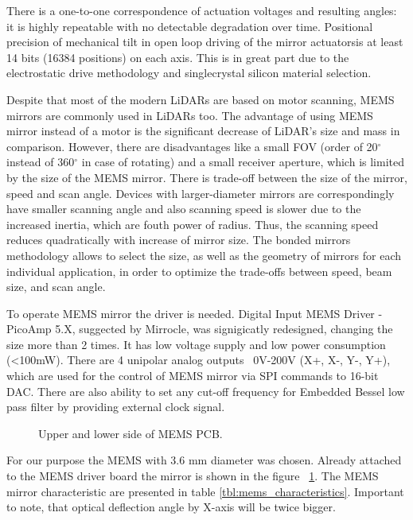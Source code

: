 There is a one-to-one correspondence of actuation voltages and resulting angles: it is highly repeatable with no detectable degradation over time.  
Positional precision of mechanical tilt in open loop driving of the mirror actuatorsis at least 14 bits (16384 positions) on each axis. 
This is in great part due to the electrostatic drive methodology and singlecrystal silicon material selection.


Despite that most of the modern LiDARs are based on motor scanning, MEMS mirrors are commonly used in LiDARs too. The advantage of using MEMS mirror instead of a motor is the significant decrease of LiDAR’s size and mass in comparison. However, there are disadvantages like a small FOV (order of 20$^\circ$ instead of 360$^\circ$ in case of rotating) and a small receiver aperture, which is limited by the size of the MEMS mirror. There is trade-off between the size of the mirror, speed and scan angle. Devices with larger-diameter mirrors are correspondingly have smaller scanning angle and also scanning speed is slower due to the increased inertia, which are fouth power of radius. Thus, the scanning speed reduces quadratically with increase of mirror size.
The bonded mirrors methodology allows to select the size, as well as the geometry of mirrors for each individual application, in order to optimize the trade-offs between speed, beam size, and scan angle.


To operate MEMS mirror the driver is needed.
Digital Input MEMS Driver - PicoAmp 5.X, suggected by Mirrocle, was signigicatly redesigned, changing the size more than 2 times.
It has low voltage supply and low power consumption (<100mW).
There are 4 unipolar analog outputs ~0V-200V (X+, X-, Y-, Y+), which are used for the control of MEMS mirror via SPI commands to 16-bit DAC.
There are also ability to set any cut-off frequency for Embedded Bessel low pass filter by providing external clock signal.


\begin{figure}[H]
\caption{Upper and lower side of MEMS PCB.}
\label{fig:MEMS_PCB}
\end{figure}



For our purpose the MEMS with 3.6 mm diameter was chosen.
Already attached to the MEMS driver board the mirror is shown in the figure 
~\ref{fig:MEMS_PCB}.
The MEMS mirror characteristic are presented in table \ref{tbl:mems_characteristics}.
Important to note, that optical deflection angle by X-axis will be twice bigger.

